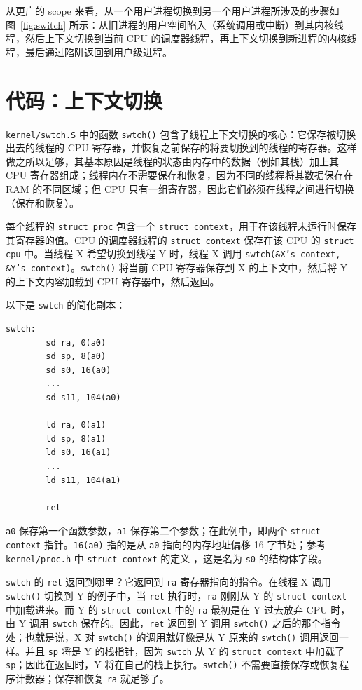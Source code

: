 从更广的 scope 来看，从一个用户进程切换到另一个用户进程所涉及的步骤如图~\ref{fig:switch} 所示：从旧进程的用户空间陷入（系统调用或中断）到其内核线程，然后上下文切换到当前 CPU 的调度器线程，再上下文切换到新进程的内核线程，最后通过陷阱返回到用户级进程。

\section{代码：上下文切换}

{\tt kernel/swtch.S} 中的函数 {\tt swtch()} 包含了线程上下文切换的核心：它保存被切换出去的线程的 CPU 寄存器，并恢复之前保存的将要切换到的线程的寄存器。这样做之所以足够，其基本原因是线程的状态由内存中的数据（例如其栈）加上其 CPU 寄存器组成；线程内存不需要保存和恢复，因为不同的线程将其数据保存在 RAM 的不同区域；但 CPU 只有一组寄存器，因此它们必须在线程之间进行切换（保存和恢复）。

每个线程的 {\tt struct proc} 包含一个 {\tt struct context}，用于在该线程未运行时保存其寄存器的值。CPU 的调度器线程的 {\tt struct context} 保存在该 CPU 的 {\tt struct cpu} 中。当线程 X 希望切换到线程 Y 时，线程 X 调用 {\tt swtch(\&X's context, \&Y's context)}。{\tt swtch()} 将当前 CPU 寄存器保存到 X 的上下文中，然后将 Y 的上下文内容加载到 CPU 寄存器中，然后返回。

以下是 {\tt swtch} 的简化副本：

\begin{verbatim}
swtch:
        sd ra, 0(a0)
        sd sp, 8(a0)
        sd s0, 16(a0)
        ...
        sd s11, 104(a0)

        ld ra, 0(a1)
        ld sp, 8(a1)
        ld s0, 16(a1)
        ...
        ld s11, 104(a1)
        
        ret
\end{verbatim}

{\tt a0} 保存第一个函数参数，{\tt a1} 保存第二个参数；在此例中，即两个 {\tt struct context} 指针。{\tt 16(a0)} 指的是从 {\tt a0} 指向的内存地址偏移 16 字节处；参考 {\tt kernel/proc.h} 中 {\tt struct context} 的定义 ，这是名为 {\tt s0} 的结构体字段。

{\tt swtch} 的 {\tt ret} 返回到哪里？它返回到 {\tt ra} 寄存器指向的指令。在线程 X 调用 {\tt swtch()} 切换到 Y 的例子中，当 {\tt ret} 执行时，{\tt ra} 刚刚从 Y 的 {\tt struct context} 中加载进来。而 Y 的 {\tt struct context} 中的 {\tt ra} 最初是在 Y 过去放弃 CPU 时，由 Y 调用 {\tt swtch} 保存的。因此，{\tt ret} 返回到 Y 调用 {\tt swtch()} 之后的那个指令处；也就是说，X 对 {\tt swtch()} 的调用就好像是从 Y 原来的 {\tt swtch()} 调用返回一样。并且 {\tt sp} 将是 Y 的栈指针，因为 {\tt swtch} 从 Y 的 {\tt struct context} 中加载了 {\tt sp}；因此在返回时，Y 将在自己的栈上执行。{\tt swtch()} 不需要直接保存或恢复程序计数器；保存和恢复 {\tt ra} 就足够了。

